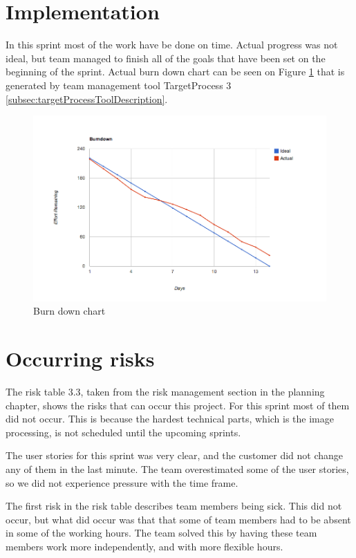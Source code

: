 \section{Implementation}

In this sprint most of the work have be done on time. Actual progress was not ideal, but team managed to finish all of the goals that have been set on the beginning of the sprint.
Actual burn down chart can be seen on Figure \ref{fig:Burn1 } that is generated by team  management tool TargetProcess 3 \ref{subsec:targetProcessToolDescription}.  

\begin{figure}[H]
	\centering
		\includegraphics[width=18cm]{sprint1/BurndownSprint1.png}
	\caption{Burn down chart}
	\label{fig:Burn1 }
\end{figure}


\section{Occurring risks}
The risk table 3.3, taken from the risk management section in the planning chapter, shows the risks that can occur this project. 
For this sprint most of them did not occur. 
This is because the hardest technical parts, which is the image processing, is not scheduled until the upcoming sprints. 

The user stories for this sprint was very clear, and the customer did not change any of them in the last minute. The team overestimated some of the user stories, so we did not experience pressure with the time frame. 

The first risk in the risk table describes team members being sick. This did not occur, but what did occur was that that some of team members had to be absent in some of the working hours. 
The team solved this by having these team members work more independently, and with more flexible hours.  

